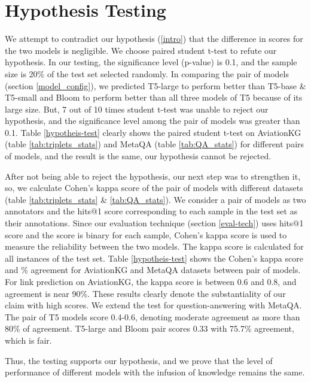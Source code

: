 \documentclass[11pt]{article}
\begin{document}
\section{Hypothesis Testing} 
\label{hypo-testing}

We attempt to contradict our hypothesis (\ref{intro}) that the difference in scores for the two models is negligible. We choose paired student t-test \cite{hsu2014paired} to refute our hypothesis. In our testing, the significance level (p-value) is 0.1, and the sample size is 20\% of the test set selected randomly. In comparing the pair of models (section \ref{model_config}), we predicted T5-large to perform better than T5-base \& T5-small and Bloom to perform better than all three models of T5 because of its large size. But, 7 out of 10 times student t-test was unable to reject our hypothesis, and the significance level among the pair of models was greater than 0.1. Table \ref{hypotheis-test} clearly shows the paired student t-test on AviationKG (table \ref{tab:triplets_stats}) and MetaQA (table \ref{tab:QA_stats}) for different pairs of models, and the result is the same, our hypothesis cannot be rejected. 
\par
After not being able to reject the hypothesis, our next step was to strengthen it, so, we calculate Cohen's kappa \cite{cohen1968weighted} score of the pair of models with different datasets (table \ref{tab:triplets_stats} \& \ref{tab:QA_stats}). We consider a pair of models as two annotators and the hits@1 score corresponding to each sample in the test set as their annotations. 
Since our evaluation technique (section \ref{eval-tech}) uses hits@1 score and the score is binary for each sample, Cohen's kappa score is used to measure the reliability between the two models.
The kappa score is calculated for all instances of the test set.
Table \ref{hypotheis-test} shows the Cohen's kappa score and \% agreement for AviationKG and MetaQA datasets between pair of models. For link prediction on AviationKG, the kappa score is between 0.6 and 0.8, and agreement is near 90\%. These results clearly denote the substantiality of our claim with high scores. We extend the test for question-answering with MetaQA. The pair of T5 models score 0.4-0.6, denoting moderate agreement as more than 80\% of agreement. T5-large and Bloom pair scores 0.33 with 75.7\% agreement, which is fair. 
\par
Thus, the testing supports our hypothesis, and we prove that the level of performance of different models with the infusion of knowledge remains the same.
\end{document}
